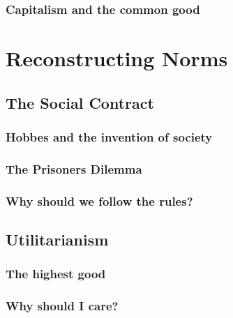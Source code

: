 \documentclass[]{book}
\begin{document}
\hypertarget{capitalism-and-the-common-good}{%
\section{Capitalism and the common good}\label{capitalism-and-the-common-good}}

\hypertarget{part-reconstructing-norms}{%
\part*{Reconstructing Norms}\label{part-reconstructing-norms}}


\hypertarget{the-social-contract}{%
\chapter{The Social Contract}\label{the-social-contract}}

\hypertarget{hobbes-and-the-invention-of-society}{%
\section{Hobbes and the invention of society}\label{hobbes-and-the-invention-of-society}}

\hypertarget{the-prisoners-dilemma}{%
\section{The Prisoners Dilemma}\label{the-prisoners-dilemma}}

\hypertarget{why-should-we-follow-the-rules}{%
\section{Why should we follow the rules?}\label{why-should-we-follow-the-rules}}

\hypertarget{utilitarianism}{%
\chapter{Utilitarianism}\label{utilitarianism}}

\hypertarget{the-highest-good}{%
\section{The highest good}\label{the-highest-good}}

\hypertarget{why-should-i-care}{%
\section{Why should I care?}\label{why-should-i-care}}
\end{document}

